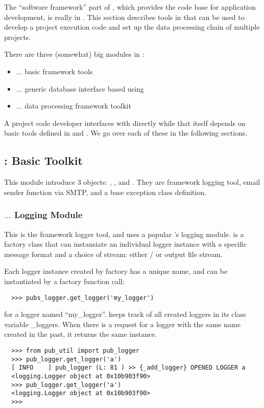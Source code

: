 The ``software framework'' part of {\pubs}, which provides the code base 
for application development, is really in {\python}. This section describes
 {\python} tools in {\pubs} that can be used to develop a project execution 
code and set up the data processing chain of multiple projects.

There are three (somewhat) big {\python} modules in {\pubs}:
\begin{itemize}
  \item {\pubutil} $\ldots$ basic framework tools
  \item {\pubdbi} $\ldots$ generic database interface based using {\psycopg}
  \item {\dstream} $\ldots$ data processing framework toolkit
\end{itemize}
A project code developer interfaces with {\dstream} directly while that itself 
depends on basic tools defined in {\pubutil} and {\pubdbi}. We go over each 
of these in the following sections. 

\subsection{{\pubutil}: Basic Toolkit}
This module introduce 3 objects: {\publogger}, {\pubsmtp}, and {\pubexception}.
They are framework logging tool, email sender function via SMTP, and a base exception
class definition. 

\subsubsection{{\publogger} $\ldots$ Logging Module}
This is the framework logger tool, and uses a popular {\python}'s logging module.
{\publogger} is a factory class that can instansiate an individual logger instance
with a specific message format and a choice of stream: either {\stdout}/{\stderr} or
output file stream. 

Each logger instance created by {\publogger} factory has a unique name, and 
can be instantiated by a factory function call:
\begin{lstlisting}
  >>> pubs_logger.get_logger('my_logger')
\end{lstlisting}
for a logger named ``my\_logger''. {\publogger} keeps track of all created loggers 
in its class variable {\ttfamily \_loggers}. When there is a request for a logger
with the same name created in the past, it returns the same instance.
\begin{lstlisting}
  >>> from pub_util import pub_logger
  >>> pub_logger.get_logger('a')
  [ INFO    ] pub_logger (L: 81 ) >> {_add_logger} OPENED LOGGER a
  <logging.Logger object at 0x10b903f90>
  >>> pub_logger.get_logger('a')
  <logging.Logger object at 0x10b903f90>
  >>>
\end{lstlisting}

